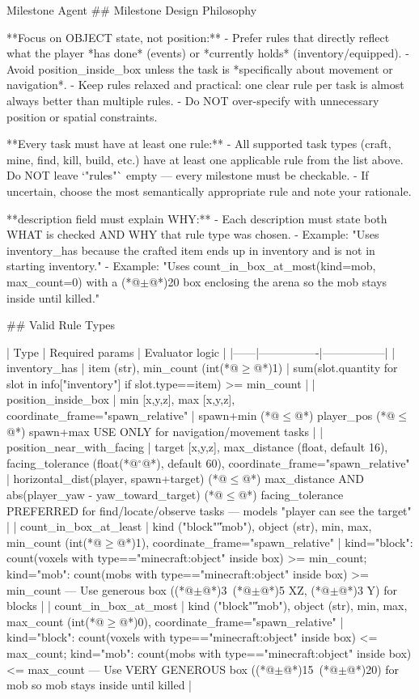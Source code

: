 \documentclass[11pt]{article}
\begin{document}
\begin{center}
\begin{widepromptbox}{Milestone Agent}
## Milestone Design Philosophy

**Focus on OBJECT state, not position:**
- Prefer rules that directly reflect what the player *has done* (events) or *currently holds* (inventory/equipped).
- Avoid position_inside_box unless the task is *specifically about movement or navigation*.
- Keep rules relaxed and practical: one clear rule per task is almost always better than multiple rules.
- Do NOT over-specify with unnecessary position or spatial constraints.

**Every task must have at least one rule:**
- All supported task types (craft, mine, find, kill, build, etc.) have at least one applicable
  rule from the list above. Do NOT leave `"rules"` empty — every milestone must be checkable.
- If uncertain, choose the most semantically appropriate rule and note your rationale.

**description field must explain WHY:**
- Each description must state both WHAT is checked AND WHY that rule type was chosen.
- Example: "Uses inventory_has because the crafted item ends up in inventory and is not in starting inventory."
- Example: "Uses count_in_box_at_most(kind=mob, max_count=0) with a (*@$\pm$@*)20 box enclosing the arena so the mob stays inside until killed."

## Valid Rule Types

| Type | Required params | Evaluator logic |
|------|----------------|-----------------|
| inventory_has | item (str), min_count (int(*@$\geq$@*)1) | sum(slot.quantity for slot in info["inventory"] if slot.type==item) >= min_count |
| position_inside_box | min [x,y,z], max [x,y,z], coordinate_frame="spawn_relative" | spawn+min (*@$\leq$@*) player_pos (*@$\leq$@*) spawn+max USE ONLY for navigation/movement tasks |
| position_near_with_facing | target [x,y,z], max_distance (float, default 16), facing_tolerance (float(*@$^\circ$@*), default 60), coordinate_frame="spawn_relative" | horizontal_dist(player, spawn+target) (*@$\leq$@*) max_distance AND abs(player_yaw - yaw_toward_target) (*@$\leq$@*) facing_tolerance PREFERRED for find/locate/observe tasks — models "player can see the target" |
| count_in_box_at_least | kind ("block"\|"mob"), object (str), min, max, min_count (int(*@$\geq$@*)1), coordinate_frame="spawn_relative" | kind="block": count(voxels with type=="minecraft:object" inside box) >= min_count; kind="mob": count(mobs with type=="minecraft:object" inside box) >= min_count  — Use generous box ((*@$\pm$@*)3~(*@$\pm$@*)5 XZ, (*@$\pm$@*)3 Y) for blocks |
| count_in_box_at_most | kind ("block"\|"mob"), object (str), min, max, max_count (int(*@$\geq$@*)0), coordinate_frame="spawn_relative" | kind="block": count(voxels with type=="minecraft:object" inside box) <= max_count; kind="mob": count(mobs with type=="minecraft:object" inside box) <= max_count  — Use VERY GENEROUS box ((*@$\pm$@*)15~(*@$\pm$@*)20) for mob so mob stays inside until killed |


\end{widepromptbox}
\end{center}
\end{document}
